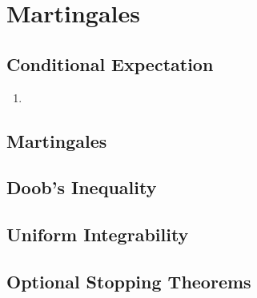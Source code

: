 \chapter{Martingales}

\section{Conditional Expectation}

\begin{definition}
    
\end{definition}

\begin{example}
    \begin{enumerate}
        \item 
    \end{enumerate}
\end{example}

\section{Martingales}

\begin{definition}[Martingale]
    
\end{definition}

\begin{example}
    
\end{example}

\section{Doob's Inequality}

\begin{theorem}
    
\end{theorem}

\begin{theorem}
    
\end{theorem}

\begin{theorem}
    
\end{theorem}

\section{Uniform Integrability}

\section{Optional Stopping Theorems}
